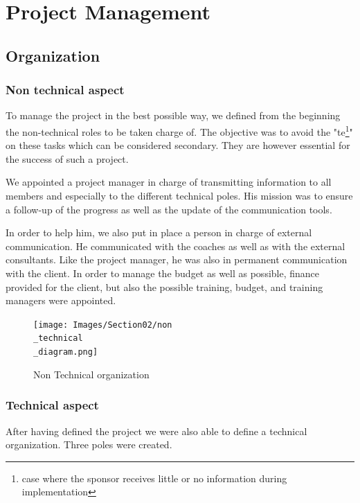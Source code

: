 \section{Project Management}\insertloftspace
\setcounter{figure}{0}\setcounter{table}{0}

\subsection{Organization}
\subsubsection{Non technical aspect}

To manage the project in the best possible way, we defined from the beginning the non-technical roles to be taken charge of. The objective was to avoid the "\gls{te}\footnote{case where the sponsor receives little or no information during implementation}" on these tasks which can be considered secondary. They are however essential for the success of such a project. 

\bigbreak
We appointed a project manager in charge of transmitting information to all members and especially to the different technical poles. His mission was to ensure a follow-up of the progress as well as the update of the communication tools. 

\bigbreak
In order to help him, we also put in place a person in charge of external communication. He communicated with the coaches as well as with the external consultants. Like the project manager, he was also in permanent communication with the client. In order to manage the budget as well as possible, finance provided for the client, but also the possible training, budget, and training managers were appointed. 

\begin{figure}[ht]
    \centering
    \texttt{[image: Images/Section02/non\\\_technical\\\_diagram.png]}
    \caption{Non Technical organization}
    \label{fig:nonTechOrga}
\end{figure}

\subsubsection{Technical aspect}

After having defined the project we were also able to define a technical organization. Three poles were created. 

